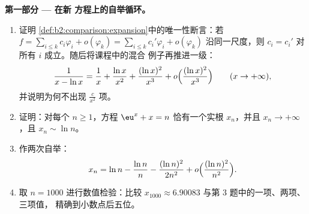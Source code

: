 \begin{problem}
\label{pb:b2:comparison:1}

\medskip
\noindent\textbf{第一部分 --- 在新
方程上的自举循环。}
\begin{enumerate}
  \item 证明
        \cref{def:b2:comparison:expansion}中的唯一性断言：若 $f = \sum_{i\leq
        k} c_i\varphi_i + o(\varphi_k) = \sum_{i \leq k}
        c_i'\varphi_i + o(\varphi_k)$ 沿同一尺度，则
        $c_i = c_i'$ 对所有 $i$ 成立。随后将课程中的混合
        例子再推进一级：
        \[
        \frac{1}{x - \ln x} = \frac1x + \frac{\ln x}{x^2} +
        \frac{(\ln x)^2}{x^3} + o\Bigl(\frac{(\ln
        x)^2}{x^3}\Bigr) \qquad (x \to +\infty),
        \]
        并说明为何不出现 $\frac{c}{x^2}$ 项。
  \item 证明：对每个 $n \geq 1$，方程 $\eu^x + x =
        n$ 恰有一个实根 $x_n$，并且 $x_n
        \to +\infty$，且 $x_n \sim \ln n$。
  \item 作两次自举：
        \[
        x_n = \ln n - \frac{\ln n}{n} - \frac{(\ln n)^2}{2n^2} +
        o\Bigl(\frac{(\ln n)^2}{n^2}\Bigr).
        \]
  \item 取 $n = 1000$ 进行数值检验：比较 $x_{1000}
        \approx 6.90083$ 与第 3 题中的一项、两项、三项值，
        精确到小数点后五位。
\end{enumerate}


\end{problem}
